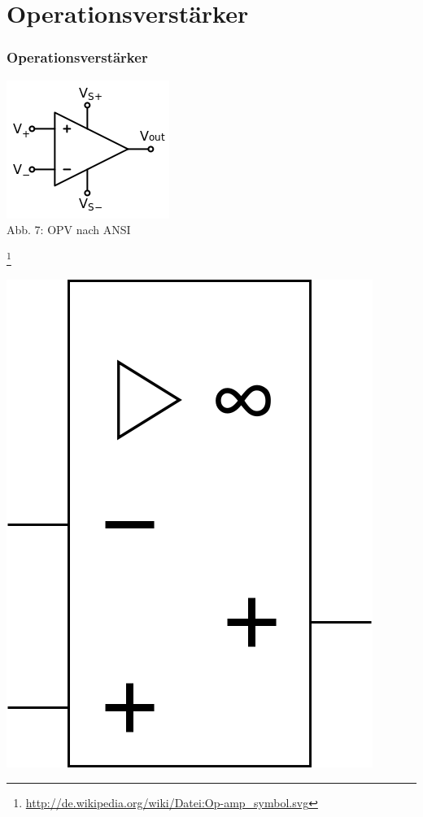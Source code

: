 \section*{Operationsverstärker}
\begin{frame}
\frametitle{Operationsverstärker}
\begin{minipage}{0.4\textwidth}
	\includegraphics[scale=0.6]{e13/OPV.png}\\
	Abb. 7: OPV nach ANSI
\end{minipage}
\footnote{\url{http://de.wikipedia.org/wiki/Datei:Op-amp_symbol.svg}}
\hspace{0.5cm}
\begin{minipage}{0.4\textwidth}
	\includegraphics[scale=0.2 ]{e13/OPV-ger.png}\\

\end{minipage}
\end{frame}
